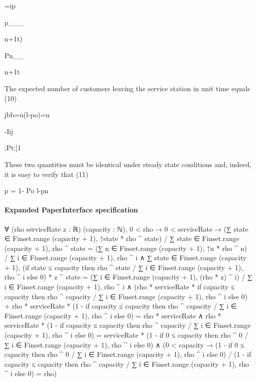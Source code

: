 \documentclass[10pt]{article}
\begin{document}
\begin{ReviewVerbatim}
=ip

p___

n+1t)

Pn__

n+1t

The expected number of customers leaving the service station in unit time equals
(10)

jbb=u(l-po)=u

-Iij

;Pt;]1

These two quantities must be identical under steady state conditions and, indeed,
it is easy to verify that
(11)

p = 1- Po
l-pn
\end{ReviewVerbatim}



\paragraph{Expanded PaperInterface specification}
\begin{ReviewVerbatim}
∀ (rho serviceRate z : ℝ) (capacity : ℕ),
  0 < rho →
    0 < serviceRate →
      (∑ state ∈ Finset.range (capacity + 1), ↑state * rho ^ state) /
            ∑ state ∈ Finset.range (capacity + 1), rho ^ state =
          (∑ n ∈ Finset.range (capacity + 1), ↑n * rho ^ n) / ∑ i ∈ Finset.range (capacity + 1), rho ^ i ∧
        ∑ state ∈ Finset.range (capacity + 1),
              (if state ≤ capacity then rho ^ state / ∑ i ∈ Finset.range (capacity + 1), rho ^ i else 0) * z ^ state =
            (∑ i ∈ Finset.range (capacity + 1), (rho * z) ^ i) / ∑ i ∈ Finset.range (capacity + 1), rho ^ i ∧
          (rho * serviceRate *
                  if capacity ≤ capacity then rho ^ capacity / ∑ i ∈ Finset.range (capacity + 1), rho ^ i else 0) +
                rho * serviceRate *
                  (1 - if capacity ≤ capacity then rho ^ capacity / ∑ i ∈ Finset.range (capacity + 1), rho ^ i else 0) =
              rho * serviceRate ∧
            rho * serviceRate *
                  (1 - if capacity ≤ capacity then rho ^ capacity / ∑ i ∈ Finset.range (capacity + 1), rho ^ i else 0) =
                serviceRate * (1 - if 0 ≤ capacity then rho ^ 0 / ∑ i ∈ Finset.range (capacity + 1), rho ^ i else 0) ∧
              (0 < capacity →
                (1 - if 0 ≤ capacity then rho ^ 0 / ∑ i ∈ Finset.range (capacity + 1), rho ^ i else 0) /
                    (1 -
                      if capacity ≤ capacity then rho ^ capacity / ∑ i ∈ Finset.range (capacity + 1), rho ^ i else 0) =
                  rho)
\end{ReviewVerbatim}
\end{document}
